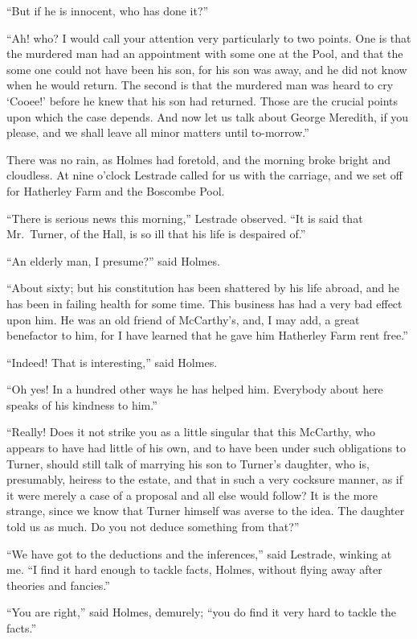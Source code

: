 “But if he is innocent, who has done it?”

“Ah! who? I would call your attention very particularly
to two points. One is that the murdered man had an appointment
with some one at the Pool, and that the some one
could not have been his son, for his son was away, and he did
not know when he would return. The second is that the
murdered man was heard to cry ‘Cooee!’ before he knew
that his son had returned. Those are the crucial points upon
which the case depends. And now let us talk about George
Meredith, if you please, and we shall leave all minor matters
until to-morrow.”

There was no rain, as Holmes had foretold, and the morning
broke bright and cloudless. At nine o’clock Lestrade
called for us with the carriage, and we set off for Hatherley
Farm and the Boscombe Pool.

“There is serious news this morning,” Lestrade observed.
“It is said that Mr.~Turner, of the Hall, is so ill that his life
is despaired of.”

“An elderly man, I presume?” said Holmes.

“About sixty; but his constitution has been shattered by
his life abroad, and he has been in failing health for some
time. This business has had a very bad effect upon him.
He was an old friend of McCarthy’s, and, I may add, a great
benefactor to him, for I have learned that he gave him
Hatherley Farm rent free.”

“Indeed! That is interesting,” said Holmes.

“Oh yes! In a hundred other ways he has helped him.
Everybody about here speaks of his kindness to him.”

“Really! Does it not strike you as a little singular that
this McCarthy, who appears to have had little of his own, and
to have been under such obligations to Turner, should still
talk of marrying his son to Turner’s daughter, who is, presumably,
heiress to the estate, and that in such a very cocksure
manner, as if it were merely a case of a proposal and all else
would follow? It is the more strange, since we know that
Turner himself was averse to the idea. The daughter told us
as much. Do you not deduce something from that?”

“We have got to the deductions and the inferences,” said
Lestrade, winking at me. “I find it hard enough to tackle
facts, Holmes, without flying away after theories and fancies.”

“You are right,” said Holmes, demurely; “you do find it
very hard to tackle the facts.”

